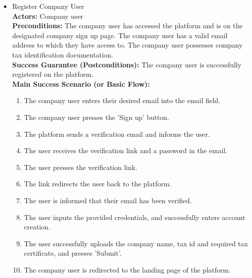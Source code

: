 \begin{itemize}[label={[\textbf{UC}]}, align=left, leftmargin=*]
     
     \item {} Register Company User \\
     \textbf{Actors:} Company user\\
     \textbf{Preconditions:} The company user has accessed the platform and is on the designated company sign up page. The company user has a valid email address to which they have access to. The company user possesses company tax identification documentation.\\
     \textbf{Success Guarantee (Postconditions):} The company user is successfully registered on the platform.\\
     \textbf{Main Success Scenario (or Basic Flow):} 
     \begin{enumerate}[label=\arabic*.] 
        \item The company user enters their desired email into the email field.
        \item The company user presses the 'Sign up' button.
        \item The platform sends a verification email and informs the user.
        \item The user receives the verification link and a password in the email.
        \item The user presses the verification link.
        \item The link redirects the user back to the platform. 
        \item The user is informed that their email has been verified.
        \item The user inputs the provided credentials, and successfully enters account creation.
        \item The user successfully uploads the company name, tax id and required tax certificate, and presses 'Submit'.
        \item The company user is redirected to the landing page of the platform.
     \end{enumerate} \\


\end{itemize}
